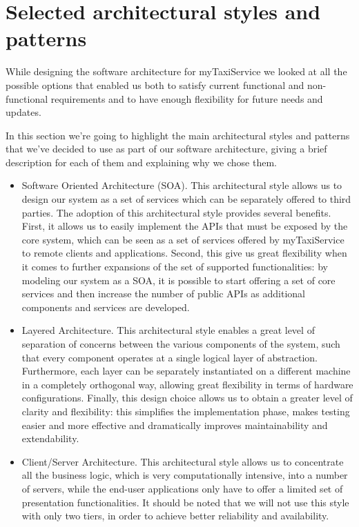 \section{Selected architectural styles and patterns}
While designing the software architecture for myTaxiService we looked at all the possible options that enabled us both to satisfy current functional and non-functional requirements and to have enough flexibility for future needs and updates.

In this section we're going to highlight the main architectural styles and patterns that we've decided to use as part of our software architecture, giving a brief description for each of them and explaining why we chose them.

\begin{itemize}
	\item Software Oriented Architecture (SOA). This architectural style allows us to design our system as a set of services which can be separately offered to third parties. The adoption of this architectural style provides several benefits. First, it allows us to easily implement the APIs that must be exposed by the core system, which can be seen as a set of services offered by myTaxiService to remote clients and applications. Second, this give us great flexibility when it comes to further expansions of the set of supported functionalities: by modeling our system as a SOA, it is possible to start offering a set of core services and then increase the number of public APIs as additional components and services are developed. 
	\item Layered Architecture. This architectural style enables a great level of separation of concerns between the various components of the system, such that every component operates at a single logical layer of abstraction. Furthermore, each layer can be separately instantiated on a different machine in a completely orthogonal way, allowing great flexibility in terms of hardware configurations. Finally, this design choice allows us to obtain a greater level of clarity and flexibility: this simplifies the implementation phase, makes testing easier and more effective and dramatically improves maintainability and extendability.
	\item Client/Server Architecture. This architectural style allows us to concentrate all the business logic, which is very computationally intensive, into a number of servers, while the end-user applications only have to offer a limited set of presentation functionalities. It should be noted that we will not use this style with only two tiers, in order to achieve better reliability and availability.

\end{itemize}

